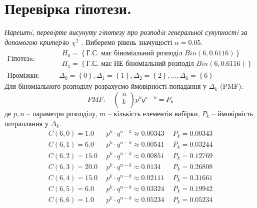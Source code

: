 \documentclass[14pt,a4paper]{scrartcl}
\theoremstyle{definition}
\theoremstyle{remark}
\theoremstyle{definition}
\theoremstyle{definition}
\begin{document}
\section{Перевірка гіпотези.}
\textit{Нарештi, перевiрте висунуту гiпотезу про розподiл генеральної сукупностi за допомогою
критерiю \( \chi^2 \) .} Виберемо рівень значущості $\alpha = 0.05$.
\[
 \begin{split}
  \text{Гіпотезa:} & \qquad \begin{gathered}
    H_0 = {\left\lbrace \text{Г.С. має біноміальний розподіл }  Bin(6, 0.6116) \right\rbrace}  \\
    H_1 = {\left\lbrace \text{Г.С. має НЕ біноміальний розподіл } Bin(6, 0.6116) \right\rbrace}
  \end{gathered}\\
  \text{Проміжки:} & \qquad \Delta_0 = \left\lbrace 0 \right\rbrace, \Delta_1 = \left\lbrace 1 \right\rbrace , \Delta_2 = \left\lbrace 2 \right\rbrace, \dots , \Delta_6 = \left\lbrace 6 \right\rbrace
 \end{split}
\]
Для біноміального розподілу розрахуємо ймовірності попадання у \( \Delta_k \) (PMF):
\[
 PMF: \quad \left( \begin{gathered}
  n\\
  k\\
 \end{gathered} \right) p^k q^{n-k} = P_k
\]
де \( p,n \) -- параметри розподілу, m -- кількість елементів вибірки, \( P_k \) -- ймовірність потрапляння у \( \Delta_k \).
\[
 \begin{array}{l|c|c}
 \  C(6,0)= 1.0 \
 & \  p^k \cdot q^{ n-k } \approx  0.00343 \   &
  \  P_k = 0.00343 \   \\ \hline
 \  C(6,1)= 6.0 \
 & \  p^k \cdot q^{ n-k } \approx  0.00541 \   &
  \  P_k = 0.03244 \   \\ \hline
 \  C(6,2)= 15.0 \
 & \  p^k \cdot q^{ n-k } \approx  0.00851 \   &
  \  P_k = 0.12769 \   \\ \hline
 \  C(6,3)= 20.0 \
 & \  p^k \cdot q^{ n-k } \approx  0.0134 \   &
  \  P_k = 0.26808 \   \\ \hline
 \  C(6,4)= 15.0 \
 & \  p^k \cdot q^{ n-k } \approx  0.02111 \   &
  \  P_k = 0.31661 \   \\ \hline
 \  C(6,5)= 6.0 \
 & \  p^k \cdot q^{ n-k } \approx  0.03324 \   &
  \  P_k = 0.19942 \   \\ \hline
 \  C(6,6)= 1.0 \
 & \  p^k \cdot q^{ n-k } \approx  0.05234 \   &
  \  P_k = 0.05234 \
 \end{array}
\]
\end{document}
